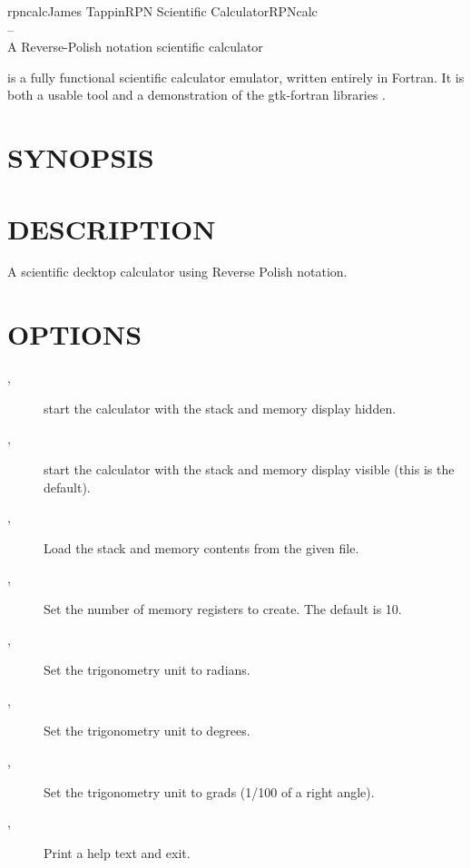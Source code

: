 \documentclass{article}
\begin{document}
\begin{Name}{1}{rpncalc}{James Tappin}{RPN Scientific Calculator}{RPNcalc\\--\\A Reverse-Polish notation scientific calculator}

    is a fully
  functional scientific calculator emulator, written entirely in
  Fortran. It is both a usable tool and a demonstration of the
  gtk-fortran libraries .
\end{Name}

\section{SYNOPSIS}

    \Dots

  \section{DESCRIPTION}

  A scientific decktop calculator using Reverse Polish notation.

  \section{OPTIONS}

  \begin{description}
  \item [, ] start the
    calculator with the stack and memory display hidden.
  \item [, ] start the calculator
    with the stack and memory display visible (this is the default).
  \item [, ]
    Load the stack and memory contents from the given file.
  \item [, ]
    Set the number of memory registers to create. The default is 10.
  \item [, ] Set the trigonometry unit to
    radians.
  \item [, ] Set the trigonometry unit to
    degrees.
  \item[, ] Set the trigonometry unit to grads
    (1/100 of a right angle).
  \item [, ] Print a help text
    and exit.
  \end{description}
\end{document}
